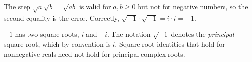 The step $\sqrt a\sqrt b=\sqrt{ab}$ is valid for $a,b\ge0$ but not for negative numbers, so the second equality is the error. Correctly, $\sqrt{-1}\cdot\sqrt{-1}=i\cdot i=-1$.

$-1$ has two square roots, $i$ and $-i$. The notation $\sqrt{-1}$ denotes the \emph{principal} square root, which by convention is $i$. Square-root identities that hold for nonnegative reals need not hold for principal complex roots.
